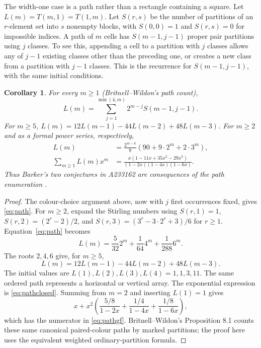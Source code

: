 \documentclass[11pt]{article}
\newtheorem{corollary}[theorem]{Corollary}
\begin{document}
The width-one case is a path rather than a rectangle containing a square.
Let $L(m)=T(m,1)=T(1,m)$.
Let $S(r,s)$ be the number of partitions of an $r$-element set into
$s$ nonempty blocks, with $S(0,0)=1$ and $S(r,s)=0$ for impossible indices.
A path of $m$ cells has $S(m-1,j-1)$ proper pair partitions using $j$
classes. To see this, appending a cell to a partition with $j$ classes
allows any of $j-1$ existing classes other than the preceding one,
or creates a new class from a partition with $j-1$ classes.
This is the recurrence for $S(m-1,j-1)$, with the same initial conditions.
\begin{corollary}\label{cor:path}
For every $m\geq1$ (Britnell--Wildon's path count),
\begin{equation}\label{eq:path}
 L(m)=\sum_{j=1}^{\min(4,m)}2^{m-j}S(m-1,j-1).
\end{equation}
For $m\geq5$, $L(m)=12L(m-1)-44L(m-2)+48L(m-3)$.
For $m\geq2$ and as a formal power series, respectively,
\begin{align}
L(m)&=\frac{2^{m-6}}{9}(90+9\cdot2^m+2\cdot3^m),\label{eq:pathclosed}\\
\sum_{m\geq1}L(m)x^m
 &=\frac{x(1-11x+35x^2-29x^3)}{(1-2x)(1-4x)(1-6x)}.\label{eq:pathgf}
\end{align}
Thus Barker's two conjectures in A233162 are consequences of the path
enumeration \cite{path-source,britnell-wildon}.
\end{corollary}
\begin{proof}
The colour-choice argument above, now with $j$ first occurrences fixed,
gives \eqref{eq:path}.
For $m\geq2$, expand the Stirling numbers using
$S(r,1)=1$, $S(r,2)=(2^r-2)/2$, and
$S(r,3)=(3^r-3\cdot2^r+3)/6$ for $r\geq1$.
Equation~\eqref{eq:path} becomes
\[
 L(m)=\frac{5}{32}2^m+\frac{1}{64}4^m+\frac{1}{288}6^m.
\]
The roots $2,4,6$ give, for $m\geq5$,
\[
 L(m)=12L(m-1)-44L(m-2)+48L(m-3).
\]
The initial values are $L(1),L(2),L(3),L(4)=1,1,3,11$.
The same ordered path represents a horizontal or vertical array.
The exponential expression is \eqref{eq:pathclosed}. Summing from $m=2$
and inserting $L(1)=1$ gives
\[
x+x^2\left(\frac{5/8}{1-2x}+\frac{1/4}{1-4x}
+\frac{1/8}{1-6x}\right),
\]
which has the numerator in \eqref{eq:pathgf}.
Britnell--Wildon's Proposition 8.1 counts these same canonical
paired-colour paths by marked partitions; the proof here uses the
equivalent weighted ordinary-partition formula.
\end{proof}
\end{document}
